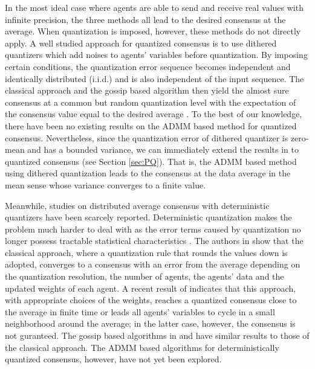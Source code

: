 \documentclass[journal]{IEEEtran}
\begin{document}
In the most ideal case where agents are able to send and receive real values with infinite precision, the three methods all lead to the desired consensus at the average. When quantization is imposed, however, these methods do not directly apply. A well studied approach for quantized consensus is to use dithered quantizers which add noises to agents' variables before quantization\cite{Schuchman1964}. By imposing certain conditions, the quantization error sequence becomes independent and identically distributed (i.i.d.) and is also independent of the input sequence. The classical approach and the gossip based algorithm then yield the almost sure consensus at a common but random quantization level with the expectation of the consensus value equal to the desired average  \cite{Aysal2008,Kar2010,Carli2010}. To the best of our knowledge, there have been no existing results on the ADMM based method for quantized consensus. Nevertheless, since the quantization error of dithered quantizer is zero-mean and has a bounded variance, we can immediately extend the results in \cite{Zhu2009, Erseghe2011} to quantized consensus (see Section \ref{sec:PQ}). That is, the ADMM based method using dithered quantization leads to the consensus at the data average in the mean sense whose variance converges to a finite value. 

Meanwhile, studies on distributed average consensus with deterministic quantizers have been scarcely reported. Deterministic quantization makes the problem much harder to deal with as the error terms caused by quantization no longer possess tractable statistical characteristics \cite{Aysal2008,Kar2010}. The authors in \cite{Nedic2009} show that the classical approach, where a quantization rule that rounds the values down is adopted, converges to a consensus with an error from the average depending on the quantization resolution, the number of agents, the agents' data and the updated weights of each agent.  A recent result of \cite{Chamie2014} indicates that this approach, with appropriate choices of the weights, reaches a quantized consensus close to the average in finite time or leads all agents' variables to cycle in a small neighborhood around the average; in the latter case, however, the consensus is not guranteed. The gossip based algorithms in \cite{Carli2010} and \cite{Kashyap2007} have similar results to those of the classical approach. The ADMM based algorithms for deterministically quantized consensus, however, have not yet been explored.
\end{document}
